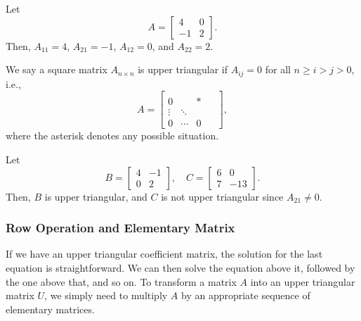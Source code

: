 \documentclass[11pt]{article}
\theoremstyle{break}
\theoremstyle{no_label}
\numberwithin{equation}{section}
\begin{document}
\begin{example}
    Let $$A=\begin{bmatrix}
        4 & 0 \\ -1 & 2
    \end{bmatrix}.$$ Then, $A_{11}=4$, $A_{21}=-1$, $A_{12}=0$, and $A_{22}=2$.
\end{example}

\begin{definition}
    We say a square matrix $A_{n\times n}$ is upper triangular if $A_{ij}=0$ for all $n\ge i>j>0$, i.e., \begin{equation*}
        A=\begin{bmatrix}
            & & &\\
           0 & & \ast &\\
           \vdots  & \ddots &  \\
           0 & \cdots & 0 & \ \ 
        \end{bmatrix},
    \end{equation*}
    where the asterisk denotes any possible situation.
\end{definition}

\begin{example}
    Let $$B=\begin{bmatrix}
        4 & -1 \\ 0 & 2
    \end{bmatrix},\quad C=\begin{bmatrix}
        6 & 0 \\ 7 & -13
    \end{bmatrix}.$$ Then, $B$ is upper triangular, and $C$
    is not upper triangular since $A_{21}\ne0$.
\end{example}

\subsubsection*{Row Operation and Elementary Matrix}

If we have an upper triangular coefficient matrix, the solution for the last equation is straightforward. We can then solve the equation above it, followed by the one above that, and so on. To transform a matrix $A$ into an upper triangular matrix $U$, we simply need to multiply $A$ by an appropriate sequence of elementary matrices.
\end{document}
